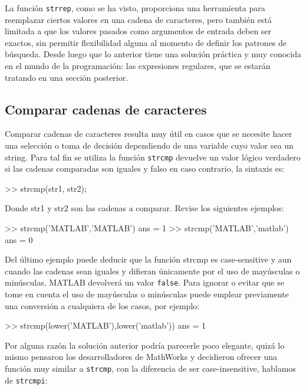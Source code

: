 La función \texttt{strrep}, como se ha visto, proporciona una
herramienta para reemplazar ciertos valores en una cadena de caracteres,
pero también está limitada a que los valores pasados como argumentos de
entrada deben ser exactos, sin permitir flexibilidad alguna al momento
de definir los patrones de búsqueda. Desde luego que lo anterior tiene
una solución práctica y muy conocida en el mundo de la programación: las
expresiones regulares, que se estarán tratando en una sección posterior.

\subsection{Comparar cadenas de caracteres}\label{comparar-cadenas-de-caracteres}

Comparar cadenas de caracteres resulta muy útil en casos que se necesite
hacer una selección o toma de decisión dependiendo de una variable cuyo
valor sea un string. Para tal fin se utiliza la función \texttt{strcmp}
devuelve un valor lógico verdadero si las cadenas comparadas son iguales
y falso en caso contrario, la sintaxis es:

\begin{matlab}
>> strcmp(str1, str2);
\end{matlab}

Donde str1 y str2 son las cadenas a comparar. Revise los siguientes
ejemplos:

\begin{matlab}
>> strcmp('MATLAB','MATLAB')
ans =
     1
>> strcmp('MATLAB','matlab')
ans =
     0
\end{matlab}

Del último ejemplo puede deducir que la función strcmp es case-sensitive
y aun cuando las cadenas sean iguales y difieran únicamente por el uso
de mayúsculas o minúsculas, MATLAB devolverá un valor \texttt{false}.
Para ignorar o evitar que se tome en cuenta el uso de mayúsculas o
minúsculas puede emplear previamente una conversión a cualquiera de los
casos, por ejemplo:

\begin{matlab}
>> strcmp(lower('MATLAB'),lower('matlab'))
ans =
     1
\end{matlab}

Por alguna razón la solución anterior podría parecerle poco elegante,
quizá lo mismo pensaron los desarrolladores de MathWorks y decidieron
ofrecer una función muy similar a \texttt{strcmp}, con la diferencia de ser
case-insensitive, hablamos de \texttt{strcmpi}:

